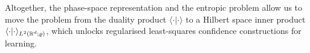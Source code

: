 Altogether, the phase-space representation and the entropic problem allow us to move the problem from the duality product $\langle\cdot\vert\cdot\rangle$ to a Hilbert space inner product $\langle\cdot\vert\cdot\rangle_{L^2(\mathbb{R}^d;\varrho)}$, which unlocks regularised least-squares confidence constructions for learning. 




